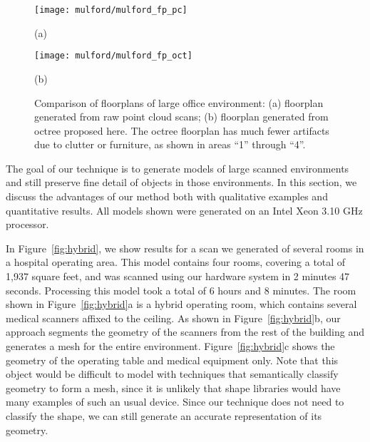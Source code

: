 \documentclass[review]{acmsiggraph}
\begin{document}
\begin{figure}[t]

	\centering

	\begin{minipage}[t]{1.0\linewidth}
		\centerline{\texttt{[image: mulford/mulford\_fp\_pc]}}
		\centerline{(a)}
	\end{minipage}

	\begin{minipage}[t]{1.0\linewidth}
		\centerline{\texttt{[image: mulford/mulford\_fp\_oct]}}
		\centerline{(b)}
	\end{minipage}

	\caption{Comparison of floorplans of large office environment: (a) floorplan generated from raw point cloud scans; (b) floorplan generated from octree proposed here.  The octree floorplan has much fewer artifacts due to clutter or furniture, as shown in areas ``1'' through ``4''.}
	\label{fig:mulford}

\end{figure}

The goal of our technique is to generate models of large scanned environments and still preserve fine detail of objects in those environments.  In this section, we discuss the advantages of our method both with qualitative examples and quantitative results.  All models shown were generated on an Intel Xeon 3.10 GHz processor.

In Figure~\ref{fig:hybrid}, we show results for a scan we generated of several rooms in a hospital operating area.  This model contains four rooms, covering a total of 1,937 square feet, and was scanned using our hardware system in 2 minutes 47 seconds.  Processing this model took a total of 6 hours and 8 minutes.  The room shown in Figure~\ref{fig:hybrid}a is a hybrid operating room, which contains several medical scanners affixed to the ceiling.  As shown in Figure~\ref{fig:hybrid}b, our approach segments the geometry of the scanners from the rest of the building and generates a mesh for the entire environment.  Figure~\ref{fig:hybrid}c shows the geometry of the operating table and medical equipment only.  Note that this object would be difficult to model with techniques that semantically classify geometry to form a mesh, since it is unlikely that shape libraries would have many examples of such an usual device.  Since our technique does not need to classify the shape, we can still generate an accurate representation of its geometry.
\end{document}
